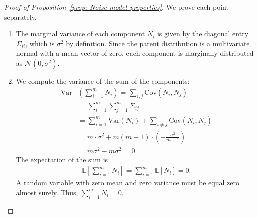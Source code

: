 \documentclass{article}
\theoremstyle{plain}
\theoremstyle{definition}
\theoremstyle{remark}
\begin{document}
\begin{proof}[Proof of Proposition~\ref{prop: Noise model properties}]
We prove each point separately.
\begin{enumerate}
    \item The marginal variance of each component $N_i$ is given by the diagonal entry $\Sigma_{ii}$, which is $\sigma^2$ by definition. Since the parent distribution is a multivariate normal with a mean vector of zero, each component is marginally distributed as $\mathcal{N}(0, \sigma^2)$.

    \item We compute the variance of the sum of the components:
        \begin{align}
            \text{Var}&\left(\sum_{i=1}^m N_i\right) = \sum_{i,j} \text{Cov}(N_i, N_j) \\
            &= \sum_{i=1}^m \sum_{j=1}^m \Sigma_{ij} \\
            &= \sum_{i=1}^m \text{Var}(N_i) + \sum_{i \ne j} \text{Cov}(N_i, N_j) \\
            &= m \cdot \sigma^2 + m(m-1) \cdot \left(-\frac{\sigma^2}{m-1}\right) \\
            &= m\sigma^2 - m\sigma^2 = 0.
        \end{align}
    The expectation of the sum is
    \begin{align}
        \mathbb{E}\left[\sum_{i=1}^m N_i\right] = \sum_{i=1}^m \mathbb{E}[N_i] = 0.
    \end{align}
    A random variable with zero mean and zero variance must be equal zero almost surely. Thus, $\sum_{i=1}^m N_i = 0$.
\end{enumerate}
\end{proof}
\end{document}
